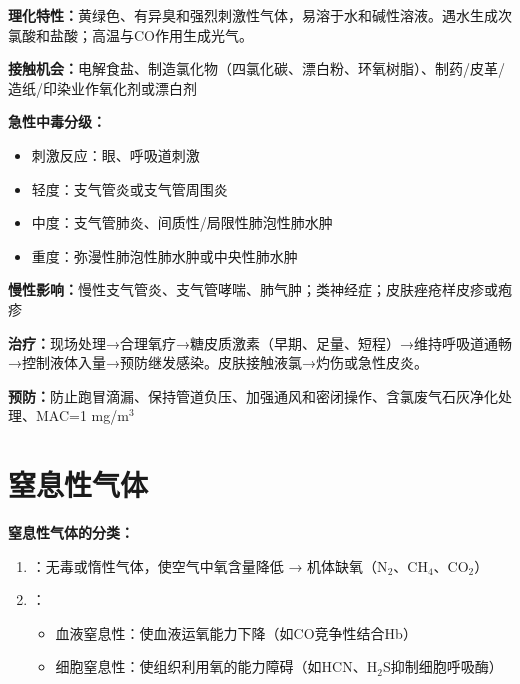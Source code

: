 \begin{keybox}
\textbf{理化特性：}黄绿色、有异臭和强烈刺激性气体，易溶于水和碱性溶液。遇水生成次氯酸和盐酸；高温与CO作用生成光气。

\textbf{接触机会：}电解食盐、制造氯化物（四氯化碳、漂白粉、环氧树脂）、制药/皮革/造纸/印染业作氧化剂或漂白剂

\textbf{急性中毒分级：}
\begin{itemize}[leftmargin=*]
    \item 刺激反应：眼、呼吸道刺激
    \item 轻度：支气管炎或支气管周围炎
    \item 中度：支气管肺炎、间质性/局限性肺泡性肺水肿
    \item 重度：弥漫性肺泡性肺水肿或中央性肺水肿
\end{itemize}

\textbf{慢性影响：}慢性支气管炎、支气管哮喘、肺气肿；类神经症；皮肤痤疮样皮疹或疱疹

\textbf{治疗：}现场处理→合理氧疗→糖皮质激素（早期、足量、短程）→维持呼吸道通畅→控制液体入量→预防继发感染。皮肤接触液氯→灼伤或急性皮炎。

\textbf{预防：}防止跑冒滴漏、保持管道负压、加强通风和密闭操作、含氯废气石灰净化处理、MAC=1 mg/m$^3$
\end{keybox}

\section{窒息性气体}

\begin{defbox}
\textbf{窒息性气体的分类：}
\begin{enumerate}[leftmargin=*]
    \item {}：无毒或惰性气体，使空气中氧含量降低 → 机体缺氧（N$_2$、CH$_4$、CO$_2$）
    \item {}：
    \begin{itemize}
        \item 血液窒息性：使血液运氧能力下降（如CO竞争性结合Hb）
        \item 细胞窒息性：使组织利用氧的能力障碍（如HCN、H$_2$S抑制细胞呼吸酶）
    \end{itemize}
\end{enumerate}
\end{defbox}

